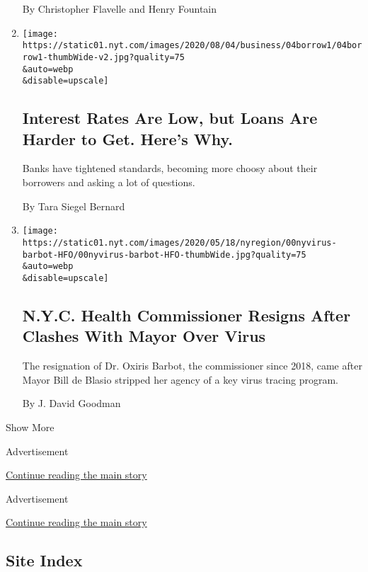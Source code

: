 \begin{enumerate}
  By Christopher Flavelle and Henry Fountain
\item
  \href{/2020/08/04/your-money/mortgage-loans-credit-cards-coronavirus.html}{}

  \texttt{[image: https://static01.nyt.com/images/2020/08/04/business/04borrow1/04borrow1-thumbWide-v2.jpg?quality=75\\\&auto=webp\\\&disable=upscale]}

  \hypertarget{interest-rates-are-low-but-loans-are-harder-to-get-heres-why}{%
  \subsection{Interest Rates Are Low, but Loans Are Harder to Get.
  Here's
  Why.}\label{interest-rates-are-low-but-loans-are-harder-to-get-heres-why}}

  Banks have tightened standards, becoming more choosy about their
  borrowers and asking a lot of questions.

  By Tara Siegel Bernard
\item
  \href{/2020/08/04/nyregion/oxiris-barbot-health-commissioner-resigns.html}{}

  \texttt{[image: https://static01.nyt.com/images/2020/05/18/nyregion/00nyvirus-barbot-HFO/00nyvirus-barbot-HFO-thumbWide.jpg?quality=75\\\&auto=webp\\\&disable=upscale]}

  \hypertarget{nyc-health-commissioner-resigns-after-clashes-with-mayor-over-virus}{%
  \subsection{N.Y.C. Health Commissioner Resigns After Clashes With
  Mayor Over
  Virus}\label{nyc-health-commissioner-resigns-after-clashes-with-mayor-over-virus}}

  The resignation of Dr. Oxiris Barbot, the commissioner since 2018,
  came after Mayor Bill de Blasio stripped her agency of a key virus
  tracing program.

  By J. David Goodman
\end{enumerate}

Show More

Advertisement

\protect\hyperlink{after-mid1}{Continue reading the main story}

Advertisement

\protect\hyperlink{after-mktg}{Continue reading the main story}

\hypertarget{site-index}{%
\subsection{Site Index}\label{site-index}}

